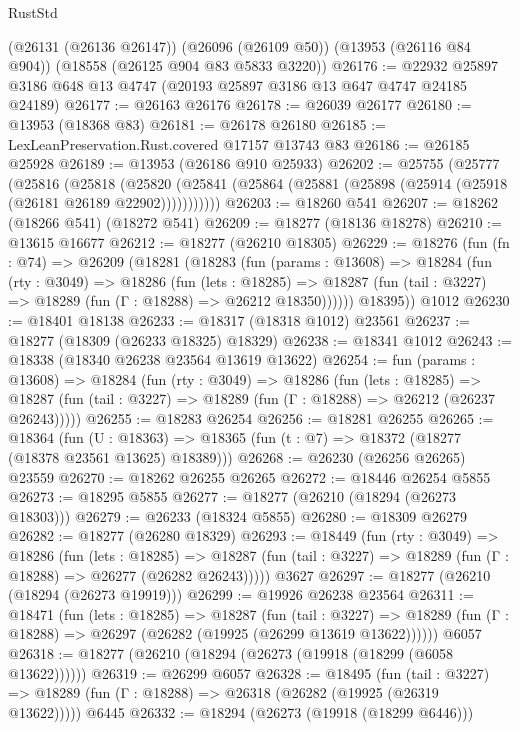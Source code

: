 \begin{lexlean}{RustStd}
\begin{coremodule}
    (@26131 (@26136 @26147))
    (@26096 (@26109 @50))
    (@13953 (@26116 @84 @904))
    (@18558 (@26125 @904 @83 @5833 @3220))
@26176 := @22932 @25897 @3186 @648 @13 @4747 (@20193 @25897 @3186 @13 @647 @4747 @24185 @24189)
@26177 := @26163 @26176
@26178 := @26039 @26177
@26180 := @13953 (@18368 @83)
@26181 := @26178 @26180
@26185 := LexLeanPreservation.Rust.covered @17157 @13743 @83
@26186 := @26185 @25928
@26189 := @13953 (@26186 @910 @25933)
@26202 := @25755
    (@25777
      (@25816
        (@25818
          (@25820 (@25841 (@25864 (@25881 (@25898 (@25914 (@25918 (@26181 @26189 @22902)))))))))))
@26203 := @18260 @541
@26207 := @18262 (@18266 @541) (@18272 @541)
@26209 := @18277 (@18136 @18278)
@26210 := @13615 @16677
@26212 := @18277 (@26210 @18305)
@26229 := @18276
    (fun (fn : @74) =>
    @26209
      (@18281
        (@18283
          (fun (params : @13608) =>
          @18284
            (fun (rty : @3049) =>
            @18286
              (fun (lets : @18285) =>
              @18287 (fun (tail : @3227) => @18289 (fun (Γ : @18288) => @26212 @18350))))))
        @18395))
    @1012
@26230 := @18401 @18138
@26233 := @18317 (@18318 @1012) @23561
@26237 := @18277 (@18309 (@26233 @18325) @18329)
@26238 := @18341 @1012
@26243 := @18338 (@18340 @26238 @23564 @13619 @13622)
@26254 := fun (params : @13608) =>
  @18284
    (fun (rty : @3049) =>
    @18286
      (fun (lets : @18285) =>
      @18287 (fun (tail : @3227) => @18289 (fun (Γ : @18288) => @26212 (@26237 @26243)))))
@26255 := @18283 @26254
@26256 := @18281 @26255
@26265 := @18364
    (fun (U : @18363) => @18365 (fun (t : @7) => @18372 (@18277 (@18378 @23561 @13625) @18389)))
@26268 := @26230 (@26256 @26265) @23559
@26270 := @18262 @26255 @26265
@26272 := @18446 @26254 @5855
@26273 := @18295 @5855
@26277 := @18277 (@26210 (@18294 (@26273 @18303)))
@26279 := @26233 (@18324 @5855)
@26280 := @18309 @26279
@26282 := @18277 (@26280 @18329)
@26293 := @18449
    (fun (rty : @3049) =>
    @18286
      (fun (lets : @18285) =>
      @18287 (fun (tail : @3227) => @18289 (fun (Γ : @18288) => @26277 (@26282 @26243)))))
    @3627
@26297 := @18277 (@26210 (@18294 (@26273 @19919)))
@26299 := @19926 @26238 @23564
@26311 := @18471
    (fun (lets : @18285) =>
    @18287
      (fun (tail : @3227) =>
      @18289 (fun (Γ : @18288) => @26297 (@26282 (@19925 (@26299 @13619 @13622))))))
    @6057
@26318 := @18277 (@26210 (@18294 (@26273 (@19918 (@18299 (@6058 @13622))))))
@26319 := @26299 @6057
@26328 := @18495
    (fun (tail : @3227) => @18289 (fun (Γ : @18288) => @26318 (@26282 (@19925 (@26319 @13622)))))
    @6445
@26332 := @18294 (@26273 (@19918 (@18299 @6446)))

\end{coremodule}
\end{lexlean}
